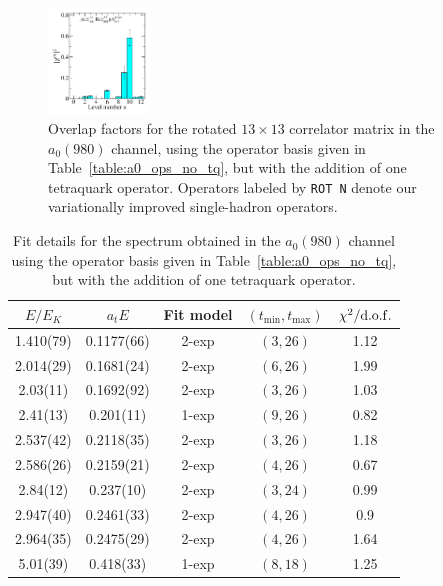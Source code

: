 \begin{figure}
  \includegraphics[width=0.24\textwidth]{figures/spectrum_a1gm/with_tq/zfactors/zfactor_isotriplet_kaon_kbar-A1gm_1-P011-A2-SS_1-P0-1-1-A2-SS_1.pdf}
  \cprotect\caption{Overlap factors for the rotated $13\times 13$ correlator matrix in the $a_0(980)$ channel, using the operator basis given in Table~\ref{table:a0_ops_no_tq}, but with the addition of one tetraquark operator. Operators labeled by \verb+ROT N+ denote our variationally improved single-hadron operators.}
  \label{fig:a0_with_tq_zfactors}
\end{figure}

\begin{table}
  \centering
  \begin{tabular}{c|c|c|c|c}
    $E / E_K$ & $a_t E$ & Fit model & $(t_{\mathrm{min}}, {t_\mathrm{max}})$ & $\chi^2 / \rm{d.o.f.}$\\
    \hline
    1.410(79)&0.1177(66)&2{-}exp&$(3, 26)$&1.12\\
    2.014(29)&0.1681(24)&2{-}exp&$(6, 26)$&1.99\\
    2.03(11)&0.1692(92)&2{-}exp&$(3, 26)$&1.03\\
    2.41(13)&0.201(11)&1{-}exp&$(9, 26)$&0.82\\
    2.537(42)&0.2118(35)&2{-}exp&$(3, 26)$&1.18\\
    2.586(26)&0.2159(21)&2{-}exp&$(4, 26)$&0.67\\
    2.84(12)&0.237(10)&2{-}exp&$(3, 24)$&0.99\\
    2.947(40)&0.2461(33)&2{-}exp&$(4, 26)$&0.9\\
    2.964(35)&0.2475(29)&2{-}exp&$(4, 26)$&1.64\\
    5.01(39)&0.418(33)&1{-}exp&$(8, 18)$&1.25
  \end{tabular}
  \caption{Fit details for the spectrum obtained in the $a_0(980)$ channel using the operator basis given in Table~\ref{table:a0_ops_no_tq}, but with the addition of one tetraquark operator.}
  \label{table:a0_with_tq_spectrum}
\end{table}

